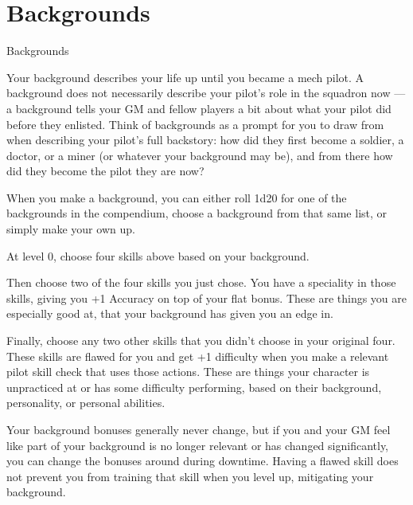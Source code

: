 \chapter{Backgrounds}
                                               Backgrounds

Your background describes your life up until you became a mech pilot. A background does not
necessarily describe your pilot’s role in the squadron now — a background tells your GM and
fellow players a bit about what your pilot did before they enlisted. Think of backgrounds as a
prompt for you to draw from when describing your pilot’s full backstory: how did they first
become a soldier, a doctor, or a miner (or whatever your background may be), and from there
how did they become the pilot they are now?


When you make a background, you can either roll 1d20 for one of the backgrounds in the
compendium, choose a background from that same list, or simply make your own up.


At level 0, choose four skills above based on your background.

Then choose two of the four skills you just chose. You have a speciality in those skills, giving
you +1 Accuracy on top of your flat bonus. These are things you are especially good at, that
your background has given you an edge in.





Finally, choose any two other skills that you didn’t choose in your original four. These skills are
flawed for you and get +1 difficulty when you make a relevant pilot skill check that uses those
actions. These are things your character is unpracticed at or has some difficulty performing,
based on their background, personality, or personal abilities.


Your background bonuses generally never change, but if you and your GM feel like part of your
background is no longer relevant or has changed significantly, you can change the bonuses
around during downtime. Having a flawed skill does not prevent you from training that skill when
you level up, mitigating your background.
